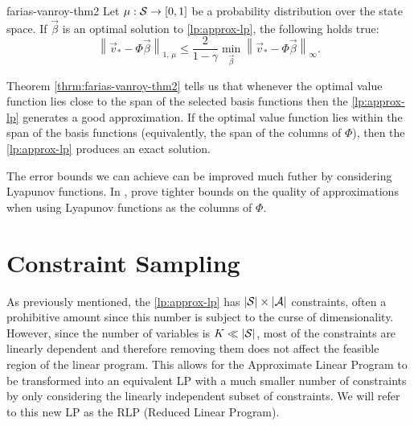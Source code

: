 \begin{thrm}{}{farias-vanroy-thm2}
    Let $\mu: \mathcal{S} \to [0,1]$ be a probability distribution over the state
    space. If $\vec{\beta}$ is an optimal solution to \eqref{lp:approx-lp}, the
    following holds true:
    \[
        \left\| \vec{v}_* - \Phi \vec{\beta} \right\|_{1, \, \mu} \leq \frac{2}{1- \gamma} \min_{\vec{\beta}} \left\| \vec{v}_* - \Phi \vec{\beta} \right\|_{\infty}.
    \]
\end{thrm}

Theorem \ref{thrm:farias-vanroy-thm2} tells us that whenever the optimal value
function lies close to the span of the selected basis functions then the
\eqref{lp:approx-lp} generates a good approximation. If the optimal value
function lies within the span of the basis functions (equivalently, the span of
the columns of $\Phi$), then the \eqref{lp:approx-lp} produces an exact
solution.

The error bounds we can achieve can be improved much futher by considering
Lyapunov functions. In \cite{farias2003LP2ADP}, \citeauthor{farias2003LP2ADP}
prove tighter bounds on the quality of approximations when using Lyapunov
functions as the columns of $\Phi$.

\section{Constraint Sampling}

As previously mentioned, the \eqref{lp:approx-lp} has $|\mathcal{S}| \times
|\mathcal{A}|$ constraints, often a prohibitive amount since this number is subject
to the curse of dimensionality. However, since the number of variables is $K \ll
|\mathcal{S}|$, most of the constraints are linearly dependent and therefore
removing them does not affect the feasible region of the linear program. This
allows for the Approximate Linear Program to be transformed into an equivalent
LP with a much smaller number of constraints by only considering the linearly
independent subset of constraints. We will refer to this new LP as the RLP
(Reduced Linear Program).

